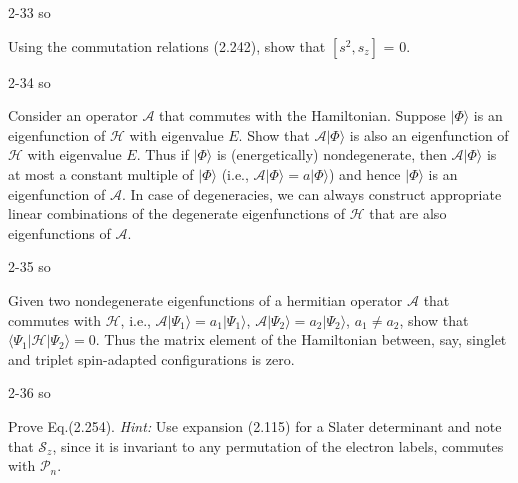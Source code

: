 \documentclass[a4paper]{book}
\begin{document}
	\begin{solution}
		2-33 so
	\end{solution}
	
	\begin{exercise}
	Using the commutation relations (2.242), show that $[s^2, s_z]$ = 0.
	\end{exercise}
	
	\begin{solution}
		2-34 so
	\end{solution}
	
	\begin{exercise}
	Consider an operator $\mathscr{A}$ that commutes with the Hamiltonian. Suppose $|\Phi\rangle$ is an eigenfunction of $\mathscr{H}$ with eigenvalue $E$. Show that $\mathscr{A}|\Phi\rangle$ is also an eigenfunction of $\mathscr{H}$ with eigenvalue $E$. Thus if $|\Phi\rangle$ is (energetically) nondegenerate, then $\mathscr{A}|\Phi\rangle$ is at most a constant multiple of $|\Phi\rangle$ (i.e., $\mathscr{A}|\Phi\rangle = a|\Phi\rangle$) and hence $|\Phi\rangle$ is an eigenfunction of $\mathscr{A}$. In case of degeneracies, we can always construct appropriate linear combinations of the degenerate eigenfunctions of $\mathscr{H}$ that are also eigenfunctions of $\mathscr{A}$.
	\end{exercise}
	
	\begin{solution}
		2-35 so
	\end{solution}
	
	\begin{exercise}
	Given two nondegenerate eigenfunctions of a hermitian operator $\mathscr{A}$ that commutes with $\mathscr{H}$, i.e., $\mathscr{A} | \Psi_1 \rangle = a_1 | \Psi_1 \rangle$, $\mathscr{A} | \Psi_2 \rangle = a_2 | \Psi_2 \rangle$, $a_1 \neq a_2$, show that $\langle \Psi_1 | \mathscr{H} | \Psi_2 \rangle = 0$. Thus the matrix element of the Hamiltonian between, say, singlet and triplet spin-adapted configurations is zero.
	\end{exercise}
	
	\begin{solution}
		2-36 so
	\end{solution}
	
	\begin{exercise}
	Prove Eq.(2.254). {\it Hint:} Use expansion (2.115) for a Slater determinant and note that $\mathscr{S}_z$, since it is invariant to any permutation of the electron labels, commutes with $\mathscr{P}_n$.
	\end{exercise}
	
\end{document}
